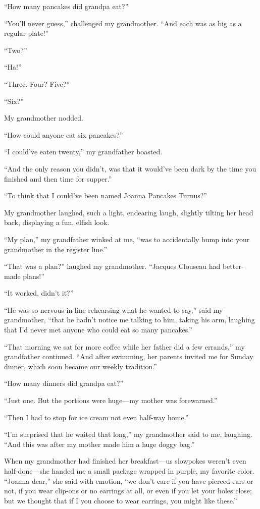 ``How many pancakes did grandpa eat?''

``You'll never guess,'' challenged my grandmother. ``And each was as big
as a regular plate!''

``Two?''

``Ha!''

``Three. Four? Five?''

``Six?''

My grandmother nodded.

``How could anyone eat six pancakes?''

``I could've eaten twenty,'' my grandfather boasted.

``And the only reason you didn't, was that it would've been dark by the
time you finished and then time for supper.''

``To think that I could've been named Joanna Pancakes Turnus?''

My grandmother laughed, such a light, endearing laugh, slightly tilting
her head back, displaying a fun, elfish look.

``My plan,'' my grandfather winked at me, ``was to accidentally bump
into your grandmother in the register line.''

``That was a plan?'' laughed my grandmother. ``Jacques Clouseau had
better-made plans!''

``It worked, didn't it?''

``He was so nervous in line rehearsing what he wanted to say,'' said my
grandmother, ``that he hadn't notice me talking to him, taking his arm,
laughing that I'd never met anyone who could eat so many pancakes.''

``That morning we sat for more coffee while her father did a few
errands,'' my grandfather continued. ``And after swimming, her parents
invited me for Sunday dinner, which soon became our weekly tradition.''

``How many dinners did grandpa eat?''

``Just one. But the portions were huge---my mother was forewarned.''

``Then I had to stop for ice cream not even half-way home.''

``I'm surprised that he waited that long,'' my grandmother said to me,
laughing. ``And this was after my mother made him a huge doggy bag.''

When my grandmother had finished her breakfast---us slowpokes weren't
even half-done---she handed me a small package wrapped in purple, my
favorite color. ``Joanna dear,'' she said with emotion, ``we don't care
if you have pierced ears or not, if you wear clip-ons or no earrings at
all, or even if you let your holes close; but we thought that if I you
choose to wear earrings, you might like these.''

